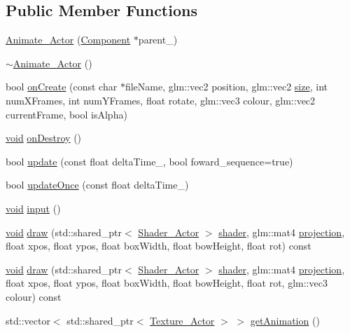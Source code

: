 \subsection*{Public Member Functions}
\begin{DoxyCompactItemize}
\item 
\hyperlink{classAnimate__Actor_aee4a76bfca6d5f49f880f20e23e968bc}{Animate\+\_\+\+Actor} (\hyperlink{classComponent}{Component} $\ast$parent\+\_\+)
\item 
\hyperlink{classAnimate__Actor_a7915c06d4d0a12655b1f3290398c109a}{$\sim$\+Animate\+\_\+\+Actor} ()
\item 
bool \hyperlink{classAnimate__Actor_a0e7160b050fd2baf26fa83890f58a154}{on\+Create} (const char $\ast$file\+Name, glm\+::vec2 position, glm\+::vec2 \hyperlink{imgui__impl__opengl3__loader_8h_a3d1e3edfcf61ca2d831883e1afbad89e}{size}, int num\+X\+Frames, int num\+Y\+Frames, float rotate, glm\+::vec3 colour, glm\+::vec2 current\+Frame, bool is\+Alpha)
\item 
\hyperlink{imgui__impl__opengl3__loader_8h_ac668e7cffd9e2e9cfee428b9b2f34fa7}{void} \hyperlink{classAnimate__Actor_ae67ff6399f3d46696f84c77b2e519ead}{on\+Destroy} ()
\item 
bool \hyperlink{classAnimate__Actor_ad68bdde59414ac429d2268fb764261d2}{update} (const float delta\+Time\+\_\+, bool foward\+\_\+sequence=true)
\item 
bool \hyperlink{classAnimate__Actor_a06e64017f84b3056ff91fb87b007e53a}{update\+Once} (const float delta\+Time\+\_\+)
\item 
\hyperlink{imgui__impl__opengl3__loader_8h_ac668e7cffd9e2e9cfee428b9b2f34fa7}{void} \hyperlink{classAnimate__Actor_a0b1f2798694dfcc5bc6401d8ed2d95d7}{input} ()
\item 
\hyperlink{imgui__impl__opengl3__loader_8h_ac668e7cffd9e2e9cfee428b9b2f34fa7}{void} \hyperlink{classAnimate__Actor_aff9d0d27d13899605b35524ac52b8324}{draw} (std\+::shared\+\_\+ptr$<$ \hyperlink{classShader__Actor}{Shader\+\_\+\+Actor} $>$ \hyperlink{imgui__impl__opengl3__loader_8h_a57b2a96adb1d51204909a82d861e395e}{shader}, glm\+::mat4 \hyperlink{main__menu__state_8cpp_a565d92bfbcc4a481d2d35f3850a382f7}{projection}, float xpos, float ypos, float box\+Width, float bow\+Height, float rot) const
\item 
\hyperlink{imgui__impl__opengl3__loader_8h_ac668e7cffd9e2e9cfee428b9b2f34fa7}{void} \hyperlink{classAnimate__Actor_af54ad48de36fd39ac7b9000c1f76d2ba}{draw} (std\+::shared\+\_\+ptr$<$ \hyperlink{classShader__Actor}{Shader\+\_\+\+Actor} $>$ \hyperlink{imgui__impl__opengl3__loader_8h_a57b2a96adb1d51204909a82d861e395e}{shader}, glm\+::mat4 \hyperlink{main__menu__state_8cpp_a565d92bfbcc4a481d2d35f3850a382f7}{projection}, float xpos, float ypos, float box\+Width, float bow\+Height, float rot, glm\+::vec3 colour) const
\item 
std\+::vector$<$ std\+::shared\+\_\+ptr$<$ \hyperlink{classTexture__Actor}{Texture\+\_\+\+Actor} $>$ $>$ \hyperlink{classAnimate__Actor_a9105a1dae4c378c98dc9112476fde7f1}{get\+Animation} ()
\end{DoxyCompactItemize}
